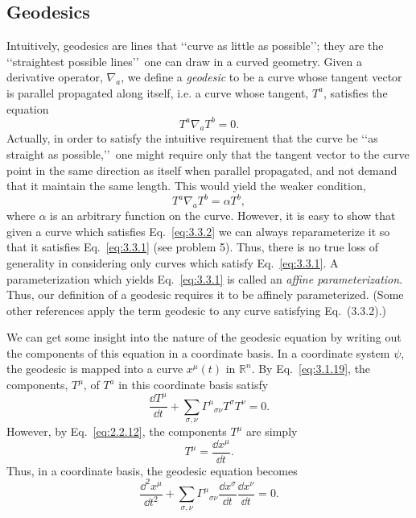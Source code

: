 
\subsection{Geodesics}\label{sec:3.3}

Intuitively, geodesics are lines that \lq\lq curve as little as possible\rq\rq; they are the
\lq\lq straightest possible lines\rq\rq\ one can draw in a curved geometry. Given a derivative
operator, $\nabla_a$, we define a \emph{geodesic} to be a curve whose tangent vector is parallel
propagated along itself, i.e. a curve whose tangent, $T^a$, satisfies the equation
\begin{equation}
  T^a\nabla_aT^b=0.
  \tag{3.3.1}\label{eq:3.3.1}
\end{equation}
Actually, in order to satisfy the intuitive requirement that the curve be \lq\lq as straight
as possible,\rq\rq\ one might require only that the tangent vector to the curve point in the
same direction as itself when parallel propagated, and not demand that it maintain
the same length. This would yield the weaker condition,
\begin{equation}
  T^a\nabla_aT^b=\alpha T^b,
  \tag{3.3.2}\label{eq:3.3.2}
\end{equation}
where $\alpha$ is an arbitrary function on the curve. However, it is easy to show that given
a curve which satisfies Eq.~\eqref{eq:3.3.2} we can always reparameterize it so that it
satisfies Eq.~\eqref{eq:3.3.1} (see problem 5). Thus, there is no true loss of generality
in considering only curves which satisfy Eq.~\eqref{eq:3.3.1}. A parameterization which
yields Eq.~\eqref{eq:3.3.1} is called an \emph{affine parameterization}. Thus, our definition of
a geodesic requires it to be affinely parameterized. (Some other references apply the
term geodesic to any curve satisfying Eq.~(3.3.2).)

We can get some insight into the nature of the geodesic equation by writing out
the components of this equation in a coordinate basis. In a coordinate system $\psi$, the
geodesic is mapped into a curve $x^\mu(t)$ in $\mathbb R^n$. By Eq.~\eqref{eq:3.1.19}, the components,
$T^\mu$, of $T^a$ in this coordinate basis satisfy
\begin{equation}
  \frac{\dd T^\mu}{\dd t}+\sum_{\sigma,\nu}\Gamma^\mu{}_{\sigma\nu}T^\sigma T^\nu=0.
  \tag{3.3.3}\label{eq:3.3.3}
\end{equation}
However, by Eq.~\eqref{eq:2.2.12}, the components $T^\mu$ are simply
\begin{equation}
  T^\mu=\frac{\dd x^\mu}{\dd t}.
  \tag{3.3.4}\label{eq:3.3.4}
\end{equation}
Thus, in a coordinate basis, the geodesic equation becomes
\begin{equation}
  \frac{\dd^2x^\mu}{\dd t^2}
  +\sum_{\sigma,\nu}\Gamma^\mu{}_{\sigma\nu}
  \frac{\dd x^\sigma}{\dd t}\frac{\dd x^\nu}{\dd t}=0.
  \tag{3.3.5}\label{eq:3.3.5}
\end{equation}

